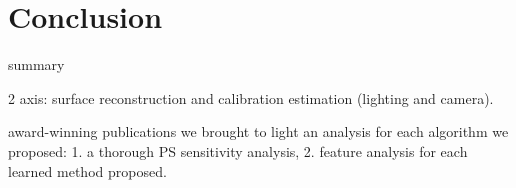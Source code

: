 \chapter*{Conclusion}         %

summary

2 axis: surface reconstruction and calibration estimation (lighting and camera).

award-winning publications
we brought to light an analysis for each algorithm we proposed: 1. a thorough PS sensitivity analysis, 2. feature analysis for each learned method proposed.
